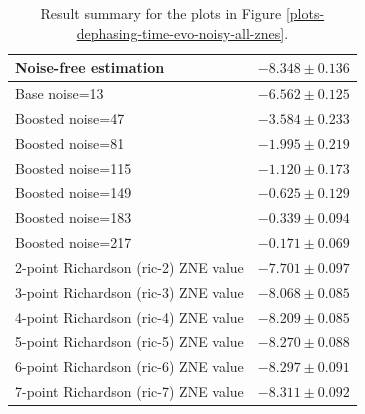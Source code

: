 \begin{table}
\caption{Result summary for the plots in Figure \ref{plots-dephasing-time-evo-noisy-all-znes}.}
\begin{tabular*}{\textwidth}{@{\extracolsep{\fill}}ll@{}}
\toprule

Noise-free estimation & $-8.348 \pm 0.136$ \\
\midrule
Base noise=13 & $-6.562 \pm 0.125$ \\
Boosted noise=47 & $-3.584 \pm 0.233$ \\
Boosted noise=81 & $-1.995 \pm 0.219$ \\
Boosted noise=115 & $-1.120 \pm 0.173$ \\
Boosted noise=149 & $-0.625 \pm 0.129$ \\
Boosted noise=183 & $-0.339 \pm 0.094$ \\
Boosted noise=217 & $-0.171 \pm 0.069$ \\
\midrule
2-point Richardson (ric-2) ZNE value & $-7.701 \pm 0.097$ \\
3-point Richardson (ric-3) ZNE value & $-8.068 \pm 0.085$ \\
4-point Richardson (ric-4) ZNE value & $-8.209 \pm 0.085$ \\
5-point Richardson (ric-5) ZNE value & $-8.270 \pm 0.088$ \\
6-point Richardson (ric-6) ZNE value & $-8.297 \pm 0.091$ \\
7-point Richardson (ric-7) ZNE value & $-8.311 \pm 0.092$ \\
\bottomrule
\end{tabular*}
\label{table-dephasing-noise-free-time-evo}
\end{table}
